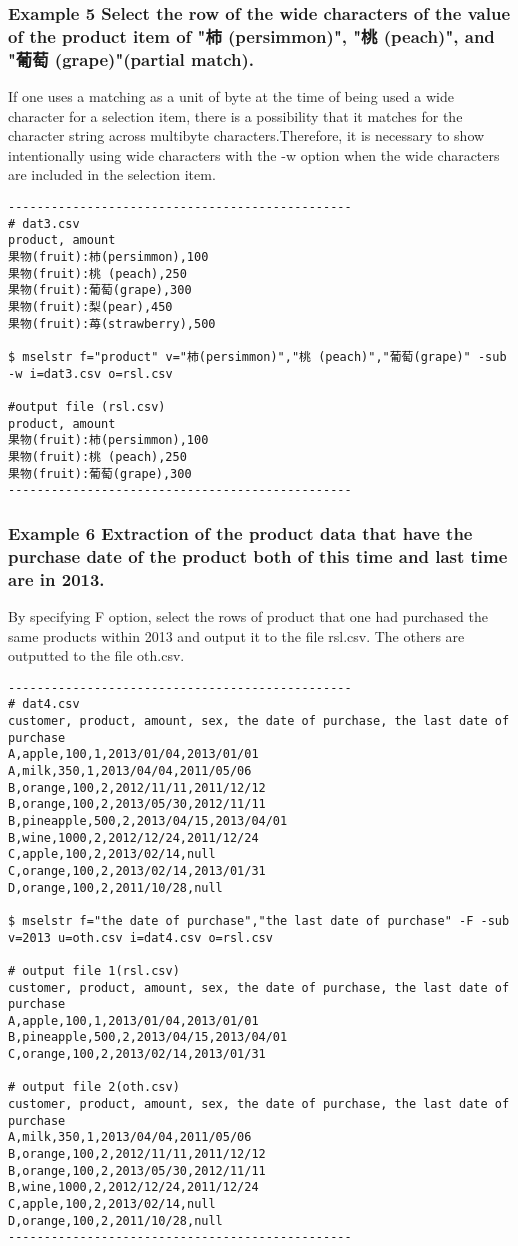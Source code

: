 \documentclass[a4paper]{jarticle}
\begin{document}
\subsubsection*{Example 5 Select the row of the wide characters of the value of the product item of "柿 (persimmon)", "桃 (peach)", and "葡萄 (grape)"(partial match).}
If one uses a matching as a unit of byte at the time of being used a wide character for a selection item, there is a possibility that it matches for the character string across  multibyte characters.Therefore, it is necessary to show intentionally using  wide characters with the -w option when the wide characters are included in the selection item.

\begin{verbatim}
------------------------------------------------
# dat3.csv
product, amount
果物(fruit):柿(persimmon),100
果物(fruit):桃 (peach),250
果物(fruit):葡萄(grape),300
果物(fruit):梨(pear),450
果物(fruit):苺(strawberry),500

$ mselstr f="product" v="柿(persimmon)","桃 (peach)","葡萄(grape)" -sub -w i=dat3.csv o=rsl.csv

#output file (rsl.csv)
product, amount
果物(fruit):柿(persimmon),100
果物(fruit):桃 (peach),250
果物(fruit):葡萄(grape),300
------------------------------------------------
\end{verbatim}

\subsubsection*{Example 6 Extraction of the product data that have the purchase date of the product both of this time and last time are in 2013.}
By specifying F option, select the rows of product that one had purchased the same products within 2013 and output it to the file rsl.csv. The others are outputted to the file oth.csv.
\begin{verbatim}
------------------------------------------------
# dat4.csv
customer, product, amount, sex, the date of purchase, the last date of purchase
A,apple,100,1,2013/01/04,2013/01/01
A,milk,350,1,2013/04/04,2011/05/06
B,orange,100,2,2012/11/11,2011/12/12
B,orange,100,2,2013/05/30,2012/11/11
B,pineapple,500,2,2013/04/15,2013/04/01
B,wine,1000,2,2012/12/24,2011/12/24
C,apple,100,2,2013/02/14,null
C,orange,100,2,2013/02/14,2013/01/31
D,orange,100,2,2011/10/28,null

$ mselstr f="the date of purchase","the last date of purchase" -F -sub v=2013 u=oth.csv i=dat4.csv o=rsl.csv

# output file 1(rsl.csv)
customer, product, amount, sex, the date of purchase, the last date of purchase
A,apple,100,1,2013/01/04,2013/01/01
B,pineapple,500,2,2013/04/15,2013/04/01
C,orange,100,2,2013/02/14,2013/01/31

# output file 2(oth.csv)
customer, product, amount, sex, the date of purchase, the last date of purchase
A,milk,350,1,2013/04/04,2011/05/06
B,orange,100,2,2012/11/11,2011/12/12
B,orange,100,2,2013/05/30,2012/11/11
B,wine,1000,2,2012/12/24,2011/12/24
C,apple,100,2,2013/02/14,null
D,orange,100,2,2011/10/28,null
------------------------------------------------
\end{verbatim}
\end{document}
